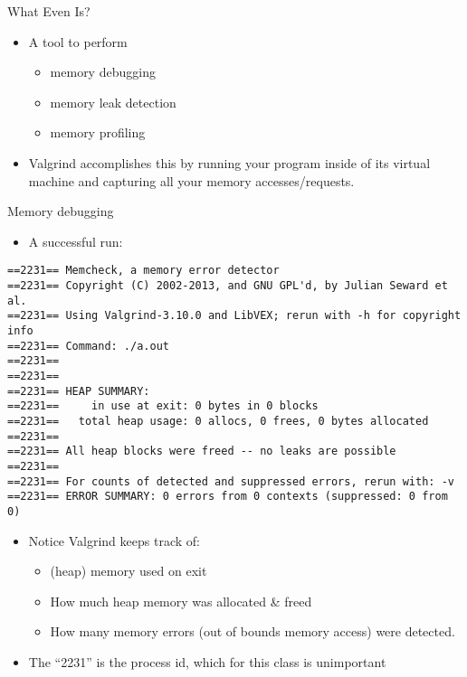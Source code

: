 \documentclass{beamer}
\begin{document}
\begin{frame}{What Even Is?}
\begin{itemize}
\item A tool to perform
\begin{itemize}
\item memory debugging
\item memory leak detection
\item memory profiling
\end{itemize}
\item Valgrind accomplishes this by running your program inside of its virtual machine and capturing all your memory accesses/requests.
\end{itemize}
\end{frame}

\begin{frame}[fragile]{Memory debugging}
\begin{itemize}
\item A successful run:
\end{itemize}
\begin{lstlisting}
==2231== Memcheck, a memory error detector
==2231== Copyright (C) 2002-2013, and GNU GPL'd, by Julian Seward et al.
==2231== Using Valgrind-3.10.0 and LibVEX; rerun with -h for copyright info
==2231== Command: ./a.out
==2231== 
==2231== 
==2231== HEAP SUMMARY:
==2231==     in use at exit: 0 bytes in 0 blocks
==2231==   total heap usage: 0 allocs, 0 frees, 0 bytes allocated
==2231== 
==2231== All heap blocks were freed -- no leaks are possible
==2231== 
==2231== For counts of detected and suppressed errors, rerun with: -v
==2231== ERROR SUMMARY: 0 errors from 0 contexts (suppressed: 0 from 0)
\end{lstlisting}
\begin{itemize}
\item Notice Valgrind keeps track of:
\begin{itemize}
\item (heap) memory used on exit
\item How much heap memory was allocated \& freed
\item How many memory errors (out of bounds memory access) were detected.
\end{itemize}
\item The ``2231'' is the process id, which for this class is unimportant
\end{itemize}
\end{frame}
\end{document}
